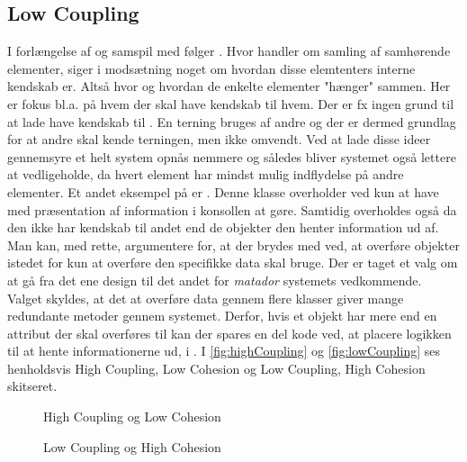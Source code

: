\subsection{Low Coupling}\label{Chapter:Design patterns:Anvendelse:Low Coupling}
I forlængelse af og samspil med  følger . Hvor  handler om samling af samhørende elementer, siger  i modsætning noget om hvordan disse elemtenters interne kendskab er. Altså hvor og hvordan de enkelte elementer "hænger" sammen. Her er fokus bl.a. på hvem der skal have kendskab til hvem. Der er fx ingen grund til at lade  have kendskab til . En terning bruges af andre og der er dermed grundlag for at andre skal kende terningen, men ikke omvendt. Ved at lade disse ideer gennemsyre et helt system opnås  nemmere og således bliver systemet også lettere at vedligeholde, da hvert element har mindst mulig indflydelse på andre elementer. Et andet eksempel på  er . Denne klasse overholder  ved kun at have med præsentation af information i konsollen at gøre. Samtidig overholdes også  da den ikke har kendskab til andet end de objekter den henter information ud af. Man kan, med rette, argumentere for, at der brydes med  ved, at overføre objekter istedet for kun at overføre den specifikke data  skal bruge. Der er taget et valg om at gå fra det ene design til det andet for \textit{matador} systemets vedkommende. Valget skyldes, at det at overføre data gennem flere klasser giver mange redundante metoder gennem systemet. Derfor, hvis et objekt har mere end en attribut der skal overføres til  kan der spares en del kode ved, at placere logikken til at hente informationerne ud, i . I \vref{fig:highCoupling} og \vref{fig:lowCoupling} ses henholdsvis High Coupling, Low Cohesion og Low Coupling, High Cohesion skitseret.

\begin{figure}
\caption{High Coupling og Low Cohesion}
\label{fig:highCoupling}
\centering

\end{figure}

\begin{figure}
\caption{Low Coupling og High Cohesion}
\label{fig:lowCoupling}
\centering

\end{figure}

